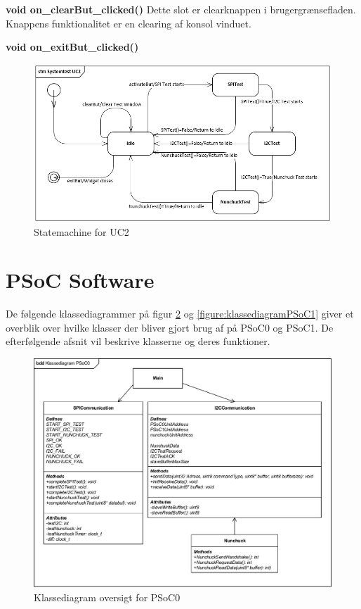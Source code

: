 \noindent\textbf{void on\_clearBut\_clicked()} \newline
Dette slot er clearknappen i brugergrænsefladen. Knappens funktionalitet er en clearing af konsol vinduet. \newline

\noindent\textbf{void on\_exitBut\_clicked()} \newline

\begin{figure}[H]
	\centering
	\includegraphics[width=\textwidth]{DesignOgImplementering/images/StateMachineGUIUC2}
	\caption{Statemachine for UC2}
	\label{fig:stmGUI}
\end{figure}


\section{PSoC Software}

De følgende klassediagrammer på figur \ref{figure:klassediagramPSoC0} og \ref{figure:klassediagramPSoC1} giver et overblik over hvilke klasser der bliver gjort brug af på PSoC0 og PSoC1. De efterfølgende afsnit vil beskrive klasserne og deres funktioner.

\begin{figure}[H]
	\centering
	\includegraphics[width=.7\textwidth]{DesignOgImplementering/images/PSoC0KlassediagramOversigt}
	\caption{Klassediagram oversigt for PSoC0}
	\label{figure:klassediagramPSoC0}
\end{figure}

